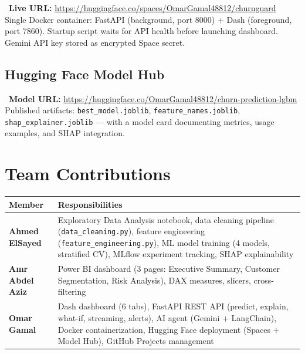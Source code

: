 \documentclass[11pt,a4paper]{article}
\newcommand{\tech}[1]{\texttt{\small\color{primarydark}#1}}
\begin{document}
\begin{infobox}
\faGlobe\ \textbf{Live URL:} \url{https://huggingface.co/spaces/OmarGamal48812/churnguard}\\[0.2cm]
Single Docker container: FastAPI (background, port 8000) + Dash (foreground, port 7860). Startup script waits for API health before launching dashboard. Gemini API key stored as encrypted Space secret.
\end{infobox}

\subsection{Hugging Face Model Hub}

\begin{infobox}
\faBoxOpen\ \textbf{Model URL:} \url{https://huggingface.co/OmarGamal48812/churn-prediction-lgbm}\\[0.2cm]
Published artifacts: \tech{best\_model.joblib}, \tech{feature\_names.joblib}, \tech{shap\_explainer.joblib} --- with a model card documenting metrics, usage examples, and SHAP integration.
\end{infobox}

\section{Team Contributions}

\begin{table}[H]
\centering
{}
\begin{tabularx}{\textwidth}{>{\bfseries}l X}
\toprule
\textbf{Member} & \textbf{Responsibilities} \\
\midrule
Ahmed ElSayed & Exploratory Data Analysis notebook, data cleaning pipeline (\tech{data\_cleaning.py}), feature engineering (\tech{feature\_engineering.py}), ML model training (4 models, stratified CV), MLflow experiment tracking, SHAP explainability \\
\midrule
Amr Abdel Aziz & Power BI dashboard (3 pages: Executive Summary, Customer Segmentation, Risk Analysis), DAX measures, slicers, cross-filtering \\
\midrule
Omar Gamal & Dash dashboard (6 tabs), FastAPI REST API (predict, explain, what-if, streaming, alerts), AI agent (Gemini + LangChain), Docker containerization, Hugging Face deployment (Spaces + Model Hub), GitHub Projects management \\
\bottomrule
\end{tabularx}
\end{table}
\end{document}
